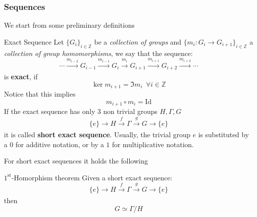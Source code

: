 \documentclass[11pt]{article}
\theoremstyle{definition}
\numberwithin{equation}{section}
\begin{document}
\subsubsection{Sequences}
We start from some preliminary definitions
\begin{defn}{Exact Sequence}{}
    Let \textit{$\{G_i\}_{i \in \mathbb{Z}}$} be a \textit{collection of groups} and \textit{$\{m_i: G_i \to G_{i+1}\}_{i \in \mathbb{Z}}$} a \textit{collection of group homomorphisms}, we say that the sequence:
\begin{equation}\label{exact}
      \cdots \xrightarrow[]{m_{i-2}} G_{i-1} \xrightarrow[]{m_{i-1}} G_i \xrightarrow[]{m_i}   G_{i+1} \xrightarrow[]{m_{i+1}} G_{i+2} \xrightarrow[]{m_{i+2}} \cdots
\end{equation}
is \textbf{exact}, if
\begin{equation*}
        \ker m_{i+1}= \Im m_i \,\,\,\forall i \in \mathbb{Z}
\end{equation*}
Notice that this implies
\begin{equation*}
          m_{i+1} \circ m_i  = \text{Id}
\end{equation*}
If the exact sequence has only $3$ non trivial groups $H, \Gamma, G$
 \begin{equation*}
      \{e\} \xrightarrow[]{} H  \xrightarrow[]{f} \Gamma \xrightarrow[]{g}   G \xrightarrow[]{} \{e\}
    \end{equation*}
it is called \textbf{short exact sequence}. Usually, the trivial group ${e}$ is substituted by a $0$ for additive notation, or by a ${1}$ for multiplicative notation.
\end{defn}
For short exact sequences it holds the following
\begin{thm}{$1^{\text{st}}$-Homorphism theorem}{}
Given a short exact sequence: 
\begin{equation*}
      \{e\} \xrightarrow[]{} H  \xrightarrow[]{f} \Gamma \xrightarrow[]{g}   G \xrightarrow[]{} \{e\}
    \end{equation*}
then
\begin{equation*}
    G \simeq  \Gamma / H
\end{equation*}
\end{thm}
\end{document}
